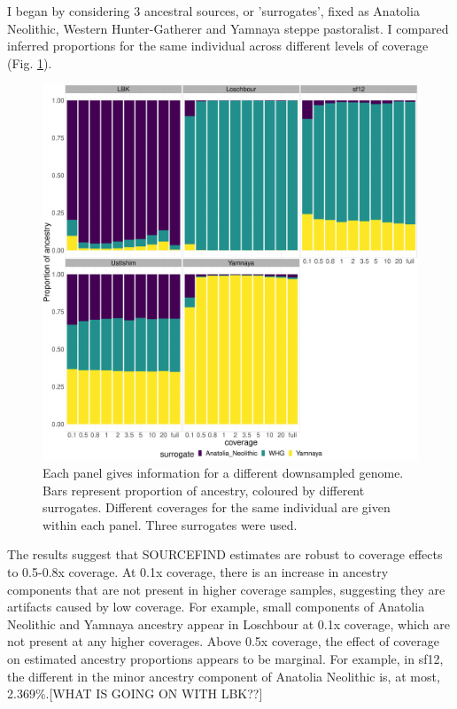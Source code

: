 I began by considering 3 ancestral sources, or 'surrogates', fixed as Anatolia Neolithic, Western Hunter-Gatherer and Yamnaya steppe pastoralist. I compared inferred proportions for the same individual across different levels of coverage (Fig. \ref{fig:3pop_SF_downsampled}). 

\begin{figure}[htp]
    \centering
    \includegraphics[width=1.0\textwidth]{../images/chapter1/3pop_SF_downsampled.pdf}
    \caption{Each panel gives information for a different downsampled genome. Bars represent proportion of ancestry, coloured by different surrogates. Different coverages for the same individual are given within each panel. {\color{red}Three} surrogates were used.}
    \label{fig:3pop_SF_downsampled}
\end{figure}

The results suggest that SOURCEFIND estimates are robust to coverage effects to 0.5-0.8x coverage. At 0.1x coverage, there is an increase in ancestry components that are not present in higher coverage samples, suggesting they are artifacts caused by low coverage. For example, small components of Anatolia Neolithic and Yamnaya ancestry appear in Loschbour at 0.1x coverage, which are not present at any higher coverages. Above 0.5x coverage, the effect of coverage on estimated ancestry proportions appears to be marginal. For example, in sf12, the different in the minor ancestry component of Anatolia Neolithic is, at most, 2.369\%.{\color{red}[WHAT IS GOING ON WITH LBK??]} 

